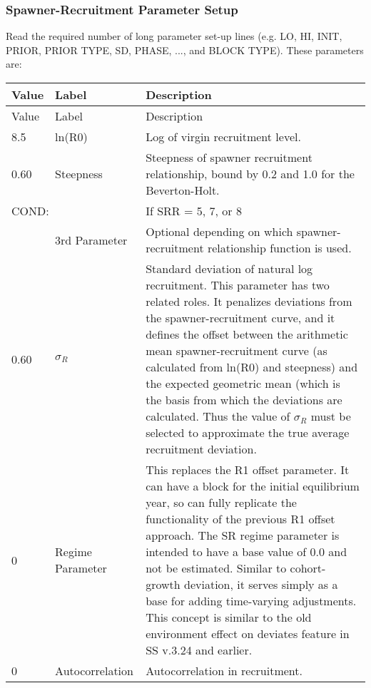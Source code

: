 \subsubsection{Spawner-Recruitment Parameter Setup}
Read the required number of long parameter set-up lines (e.g. LO, HI, INIT, PRIOR, PRIOR TYPE, SD, PHASE, ..., and BLOCK TYPE).  These parameters are:
\begin{longtable}{p{1cm} p{3cm} p{11cm}}
	\hline
	Value & Label &  Description\Tstrut\Bstrut\\
	\hline
	\endfirsthead

	\hline
	Value & Label &  Description\Tstrut\Bstrut\\
	\hline
	\endhead
	\hline
	\endfoot
	\endlastfoot

	8.5 & ln(R0) & Log of virgin recruitment level. \Tstrut\Bstrut\\
	\hline

	0.60 \Tstrut & Steepness  & Steepness of spawner recruitment relationship, bound by 0.2 and 1.0 for the Beverton-Holt.\Bstrut\\

	\multicolumn{2}{l}{COND:} \Tstrut & If SRR = 5, 7, or 8\\
	& 3rd Parameter & Optional depending on which spawner-recruitment relationship function is used.\Bstrut\\
	\hline

	0.60 \Tstrut & $\sigma_R$ &  Standard deviation of natural log recruitment. This parameter has two related roles.  It penalizes deviations from the spawner-recruitment curve, and it defines the offset between the arithmetic mean spawner-recruitment curve (as calculated from ln(R0) and steepness) and the expected geometric mean (which is the basis from which the deviations are calculated. Thus the value of $\sigma_R$ must be selected to approximate the true average recruitment deviation.\Bstrut\\

	0\Tstrut & Regime Parameter & This replaces the R1 offset parameter. It can have a block for the initial equilibrium year, so can fully replicate the functionality of the previous R1 offset approach. The SR regime parameter is intended to have a base value of 0.0 and not be estimated. Similar to cohort-growth deviation, it serves simply as a base for adding time-varying adjustments. This concept is similar to the old environment effect on deviates feature in SS v.3.24 and earlier.\Bstrut\\
	\hline

	0 & Autocorrelation & Autocorrelation in recruitment.\Tstrut\Bstrut\\
	\hline
\end{longtable}


